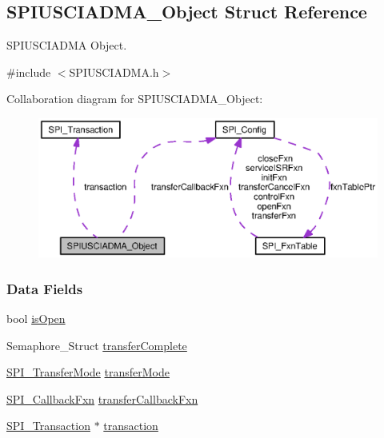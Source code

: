 \subsection{S\+P\+I\+U\+S\+C\+I\+A\+D\+M\+A\+\_\+\+Object Struct Reference}
\label{struct_s_p_i_u_s_c_i_a_d_m_a___object}


S\+P\+I\+U\+S\+C\+I\+A\+D\+M\+A Object.  




{\ttfamily \#include $<$S\+P\+I\+U\+S\+C\+I\+A\+D\+M\+A.\+h$>$}



Collaboration diagram for S\+P\+I\+U\+S\+C\+I\+A\+D\+M\+A\+\_\+\+Object\+:
\nopagebreak
\begin{figure}[H]
\begin{center}
\leavevmode
\includegraphics[width=350pt]{struct_s_p_i_u_s_c_i_a_d_m_a___object__coll__graph}
\end{center}
\end{figure}
\subsubsection*{Data Fields}
\begin{DoxyCompactItemize}
\item 
bool \hyperlink{struct_s_p_i_u_s_c_i_a_d_m_a___object_a3ffa3675d09e0d0346f89a0c88cbb9e1}{is\+Open}
\item 
Semaphore\+\_\+\+Struct \hyperlink{struct_s_p_i_u_s_c_i_a_d_m_a___object_af75e91d190a171a0824e8117f45b679e}{transfer\+Complete}
\item 
\hyperlink{_s_p_i_8h_ab9ea76c6529d6076eee5e1c4a5a92c6f}{S\+P\+I\+\_\+\+Transfer\+Mode} \hyperlink{struct_s_p_i_u_s_c_i_a_d_m_a___object_a3232e8ad2ad2cdb69726e4cbbfa03edc}{transfer\+Mode}
\item 
\hyperlink{_s_p_i_8h_a207e2d5a7e7ea5606b6995b6485ca015}{S\+P\+I\+\_\+\+Callback\+Fxn} \hyperlink{struct_s_p_i_u_s_c_i_a_d_m_a___object_a796145d03c0defb17215b30b51ab9605}{transfer\+Callback\+Fxn}
\item 
\hyperlink{struct_s_p_i___transaction}{S\+P\+I\+\_\+\+Transaction} $\ast$ \hyperlink{struct_s_p_i_u_s_c_i_a_d_m_a___object_ad4a7ffe0d4c63fa15828258e5b7204d0}{transaction}
\end{DoxyCompactItemize}


